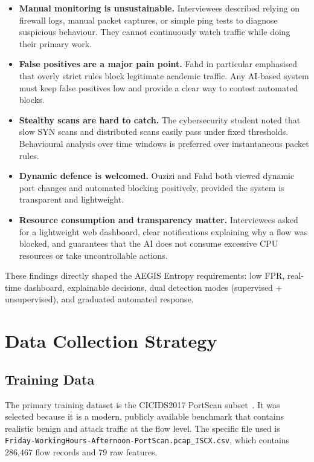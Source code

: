 \documentclass[12pt,a4paper]{report}
\begin{document}
\begin{itemize}
    \item \textbf{Manual monitoring is unsustainable.} Interviewees described relying on firewall logs, manual packet captures, or simple ping tests to diagnose suspicious behaviour. They cannot continuously watch traffic while doing their primary work.
    \item \textbf{False positives are a major pain point.} Fahd in particular emphasised that overly strict rules block legitimate academic traffic. Any AI-based system must keep false positives low and provide a clear way to contest automated blocks.
    \item \textbf{Stealthy scans are hard to catch.} The cybersecurity student noted that slow SYN scans and distributed scans easily pass under fixed thresholds. Behavioural analysis over time windows is preferred over instantaneous packet rules.
    \item \textbf{Dynamic defence is welcomed.} Ouzizi and Fahd both viewed dynamic port changes and automated blocking positively, provided the system is transparent and lightweight.
    \item \textbf{Resource consumption and transparency matter.} Interviewees asked for a lightweight web dashboard, clear notifications explaining why a flow was blocked, and guarantees that the AI does not consume excessive CPU resources or take uncontrollable actions.
\end{itemize}

These findings directly shaped the AEGIS Entropy requirements: low FPR, real-time dashboard, explainable decisions, dual detection modes (supervised + unsupervised), and graduated automated response.

\section{Data Collection Strategy}

\subsection{Training Data}

The primary training dataset is the CICIDS2017 PortScan subset~\cite{cicids2017}. It was selected because it is a modern, publicly available benchmark that contains realistic benign and attack traffic at the flow level. The specific file used is \texttt{Friday-WorkingHours-Afternoon-PortScan.pcap\_ISCX.csv}, which contains 286,467 flow records and 79 raw features.
\end{document}
